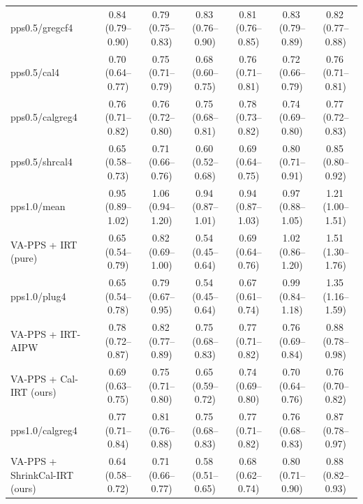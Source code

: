 \begin{tabular}{lcccccc}
pps0.5/gregcf4 & 0.84\,\scriptsize(0.79--0.90) & 0.79\,\scriptsize(0.75--0.83) & 0.83\,\scriptsize(0.76--0.90) & 0.81\,\scriptsize(0.76--0.85) & 0.83\,\scriptsize(0.79--0.89) & 0.82\,\scriptsize(0.77--0.88) \\
pps0.5/cal4 & 0.70\,\scriptsize(0.64--0.77) & 0.75\,\scriptsize(0.71--0.79) & 0.68\,\scriptsize(0.60--0.75) & 0.76\,\scriptsize(0.71--0.81) & 0.72\,\scriptsize(0.66--0.79) & 0.76\,\scriptsize(0.71--0.81) \\
pps0.5/calgreg4 & 0.76\,\scriptsize(0.71--0.82) & 0.76\,\scriptsize(0.72--0.80) & 0.75\,\scriptsize(0.68--0.81) & 0.78\,\scriptsize(0.73--0.82) & 0.74\,\scriptsize(0.69--0.80) & 0.77\,\scriptsize(0.72--0.83) \\
pps0.5/shrcal4 & 0.65\,\scriptsize(0.58--0.73) & 0.71\,\scriptsize(0.66--0.76) & 0.60\,\scriptsize(0.52--0.68) & 0.69\,\scriptsize(0.64--0.75) & 0.80\,\scriptsize(0.71--0.91) & 0.85\,\scriptsize(0.80--0.92) \\
pps1.0/mean & 0.95\,\scriptsize(0.89--1.02) & 1.06\,\scriptsize(0.94--1.20) & 0.94\,\scriptsize(0.87--1.01) & 0.94\,\scriptsize(0.87--1.03) & 0.97\,\scriptsize(0.88--1.05) & 1.21\,\scriptsize(1.00--1.51) \\
VA-PPS + IRT (pure) & 0.65\,\scriptsize(0.54--0.79) & 0.82\,\scriptsize(0.69--1.00) & 0.54\,\scriptsize(0.45--0.64) & 0.69\,\scriptsize(0.64--0.76) & 1.02\,\scriptsize(0.86--1.20) & 1.51\,\scriptsize(1.30--1.76) \\
pps1.0/plug4 & 0.65\,\scriptsize(0.54--0.78) & 0.79\,\scriptsize(0.67--0.95) & 0.54\,\scriptsize(0.45--0.64) & 0.67\,\scriptsize(0.61--0.74) & 0.99\,\scriptsize(0.84--1.18) & 1.35\,\scriptsize(1.16--1.59) \\
VA-PPS + IRT-AIPW & 0.78\,\scriptsize(0.72--0.87) & 0.82\,\scriptsize(0.77--0.89) & 0.75\,\scriptsize(0.68--0.83) & 0.77\,\scriptsize(0.71--0.82) & 0.76\,\scriptsize(0.69--0.84) & 0.88\,\scriptsize(0.78--0.98) \\
VA-PPS + Cal-IRT (ours) & 0.69\,\scriptsize(0.63--0.75) & 0.75\,\scriptsize(0.71--0.80) & 0.65\,\scriptsize(0.59--0.72) & 0.74\,\scriptsize(0.69--0.80) & 0.70\,\scriptsize(0.64--0.76) & 0.76\,\scriptsize(0.70--0.82) \\
pps1.0/calgreg4 & 0.77\,\scriptsize(0.71--0.84) & 0.81\,\scriptsize(0.76--0.88) & 0.75\,\scriptsize(0.68--0.83) & 0.77\,\scriptsize(0.71--0.82) & 0.76\,\scriptsize(0.68--0.83) & 0.87\,\scriptsize(0.78--0.97) \\
VA-PPS + ShrinkCal-IRT (ours) & 0.64\,\scriptsize(0.58--0.72) & 0.71\,\scriptsize(0.66--0.77) & 0.58\,\scriptsize(0.51--0.65) & 0.68\,\scriptsize(0.62--0.74) & 0.80\,\scriptsize(0.71--0.90) & 0.88\,\scriptsize(0.82--0.93) \\
\bottomrule
\end{tabular}
